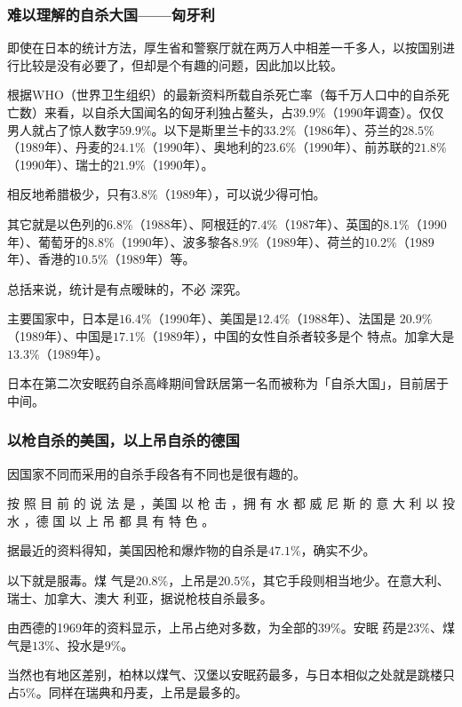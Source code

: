 \documentclass[UTF8]{ctexart}
\begin{document}
\subsubsection*{难以理解的自杀大国——匈牙利}

即使在日本的统计方法，厚生省和警察厅就在两万人中相差一千多人，以按国别进行比较是没有必要了，但却是个有趣的问题，因此加以比较。

根据WHO（世界卫生组织）的最新资料所载自杀死亡率（每千万人口中的自杀死亡数）来看，以自杀大国闻名的匈牙利独占鳌头，占$39.9\%$（1990年调查）。仅仅男人就占了惊人数字$59.9\%$。以下是斯里兰卡的$33.2\%$（1986年）、芬兰的$28.5\%$（1989年）、丹麦的$24.1\%$（1990年）、奥地利的$23.6\%$（1990年）、前苏联的$21.8\%$（1990年）、瑞士的$21.9\%$（1990年）。

相反地希腊极少，只有$3.8\%$（1989年），可以说少得可怕。

其它就是以色列的$6.8\%$（1988年）、阿根廷的$7.4\%$（1987年）、英国的$8.1\%$（1990年）、葡萄牙的$8.8\%$（1990年）、波多黎各$8.9\%$（1989年）、荷兰的$10.2\%$（1989年）、香港的$10.5\%$（1989年）等。

总括来说，统计是有点暧昧的，不必 深究。

主要国家中，日本是$16.4\%$（1990年）、美国是$12.4\%$（1988年）、法国是 $20.9\%$（1989年）、中国是$17.1\%$（1989年），中国的女性自杀者较多是个 特点。加拿大是$13.3\%$（1989年）。

日本在第二次安眠药自杀高峰期间曾跃居第一名而被称为「自杀大国」，目前居于中间。

\subsubsection*{以枪自杀的美国，以上吊自杀的德国}

因国家不同而采用的自杀手段各有不同也是很有趣的。

按 照 目 前 的 说 法 是 ，美国 以 枪 击 ，拥 有 水 都 威 尼 斯 的 意 大 利 以 投 水 ，德 国 以 上 吊 都 具 有 特 色 。

据最近的资料得知，美国因枪和爆炸物的自杀是$47.1\%$，确实不少。

以下就是服毒。煤 气是$20.8\%$，上吊是$20.5\%$，其它手段则相当地少。在意大利、瑞士、加拿大、澳大 利亚，据说枪枝自杀最多。

由西德的1969年的资料显示，上吊占绝对多数，为全部的$39\%$。安眠 药是$23\%$、煤气是$13\%$、投水是$9\%$。

当然也有地区差别，柏林以煤气、汉堡以安眠药最多，与日本相似之处就是跳楼只占$5\%$。同样在瑞典和丹麦，上吊是最多的。
\end{document}
